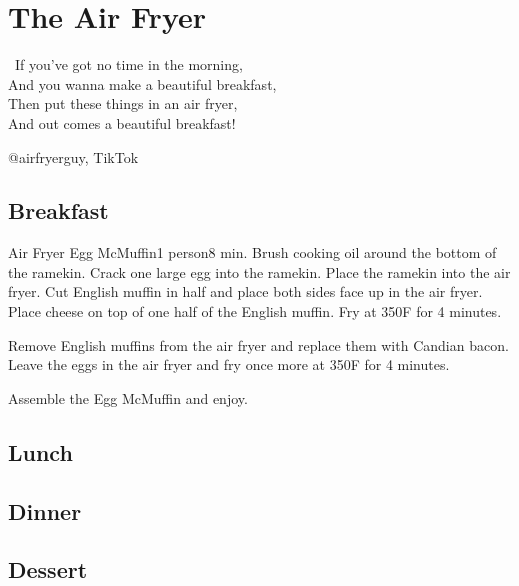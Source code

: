 \chapter{The Air Fryer}
\label{chap:air-fryer}

\epigraph{
\twonotes~If you've got no time in the morning,\\
And you wanna make a beautiful breakfast,\\
Then put these things in an air fryer,\\
And out comes a beautiful breakfast!~\eighthnote
}{@airfryerguy, TikTok}

\section{Breakfast}
\label{sec:air-fryer-breakfast}

\begin{recipe}{Air Fryer Egg McMuffin}{1 person}{8 min.}
Brush cooking oil around the bottom of the ramekin. Crack one large egg
into the ramekin. Place the ramekin into the air fryer. Cut English muffin
in half and place both sides face up in the air fryer. Place cheese on top of
one half of the English muffin.  Fry at 350\0F for 4 minutes.

Remove English muffins from the air fryer and replace them with Candian bacon.
Leave the eggs in the air fryer and fry once more at 350\0F for 4 minutes.

\newstep Assemble the Egg McMuffin and enjoy.
\end{recipe}

\section{Lunch}
\label{sec:air-fryer-lunch}

\clearpage

\section{Dinner}
\label{sec:air-fryer-dinner}

\clearpage

\section{Dessert}
\label{sec:air-fryer-dessert}

\clearpage
